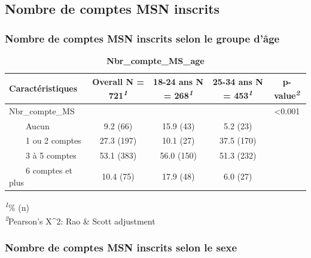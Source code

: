 \documentclass[
]{article}
\begin{document}
\vspace{2cm}

\hypertarget{nombre-de-comptes-msn-inscrits}{%
\subsection{Nombre de comptes MSN
inscrits}\label{nombre-de-comptes-msn-inscrits}}

\newpage

\hypertarget{nombre-de-comptes-msn-inscrits-selon-le-groupe-duxe2ge}{%
\subsubsection{Nombre de comptes MSN inscrits selon le groupe
d'âge}\label{nombre-de-comptes-msn-inscrits-selon-le-groupe-duxe2ge}}

\begin{table}[!t]
\caption{\label{tab:unnamed-chunk-45}\textbf{Nbr\_compte\_MS\_age}} 
\fontsize{12.0pt}{14.4pt}\selectfont
\begin{tabular*}{\linewidth}{@{\extracolsep{\fill}}lcccc}
\toprule
\textbf{Caractéristiques} & \textbf{Overall}  N = 721\textsuperscript{\textit{1}} & \textbf{18-24 ans}  N = 268\textsuperscript{\textit{1}} & \textbf{25-34 ans}  N = 453\textsuperscript{\textit{1}} & \textbf{p-value}\textsuperscript{\textit{2}} \\ 
\midrule\addlinespace[2.5pt]
Nbr\_compte\_MS &  &  &  & <0.001 \\ 
    Aucun & 9.2 (66) & 15.9 (43) & 5.2 (23) &  \\ 
    1 ou 2 comptes & 27.3 (197) & 10.1 (27) & 37.5 (170) &  \\ 
    3 à 5 comptes & 53.1 (383) & 56.0 (150) & 51.3 (232) &  \\ 
    6 comptes et plus & 10.4 (75) & 17.9 (48) & 6.0 (27) &  \\ 
\bottomrule
\end{tabular*}
\begin{minipage}{\linewidth}
\textsuperscript{\textit{1}}\% (n)\\
\textsuperscript{\textit{2}}Pearson's X\^{}2: Rao \& Scott adjustment\\
\end{minipage}
\end{table}

\vspace{1cm}

\hypertarget{nombre-de-comptes-msn-inscrits-selon-le-sexe}{%
\subsubsection{Nombre de comptes MSN inscrits selon le
sexe}\label{nombre-de-comptes-msn-inscrits-selon-le-sexe}}
\end{document}
